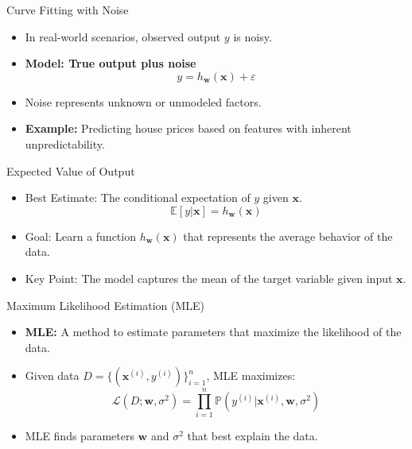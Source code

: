 \documentclass[serif, aspectratio=169]{beamer}
\begin{document}
\begin{frame}{Curve Fitting with Noise}
    \begin{itemize}
        \item In real-world scenarios, observed output \( y \) is noisy.
        \item \textbf{Model: True output plus noise}
        \[
        y = h_{\mathbf{w}}(\mathbf{x} ) + \varepsilon
        \]
        \item Noise represents unknown or unmodeled factors.
        \item \textbf{Example:} Predicting house prices based on features with inherent unpredictability.
    \end{itemize}
\end{frame}

\begin{frame}{Expected Value of Output}
    \begin{itemize}
        \item Best Estimate: The conditional expectation of \( y \) given \( \mathbf{x} \).
        \[
        \mathbb{E}[y | \mathbf{x}] = h_{\mathbf{w}}(\mathbf{x} )
        \]
        \item Goal: Learn a function \( h_{\mathbf{w}}(\mathbf{x} ) \) that represents the average behavior of the data.
        \item Key Point: The model captures the mean of the target variable given input \( \mathbf{x} \).
    \end{itemize}
\end{frame}

\begin{frame}{Maximum Likelihood Estimation (MLE)}
    \begin{itemize}
        \item \textbf{MLE:} A method to estimate parameters that maximize the likelihood of the data.
        \item Given data \( D = \{ (\mathbf{x}^{(i)}, y^{(i)}) \}_{i=1}^n \), MLE maximizes:
        \[
        \mathcal{L}(D; \mathbf{w}, \sigma^2) = \prod_{i=1}^n \mathbb{P}(y^{(i)} | \mathbf{x}^{(i)}, \mathbf{w}, \sigma^2)
        \]
        \item MLE finds parameters \( \mathbf{w} \) and \( \sigma^2 \) that best explain the data.
    \end{itemize}
\end{frame}
\end{document}

